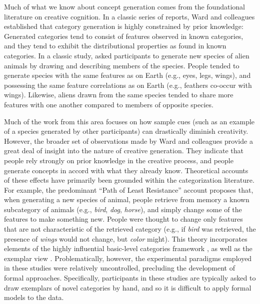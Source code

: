 \documentclass[12pt]{article}
\begin{document}
\begin{flushleft}
Much of what we know about concept generation comes from the foundational literature on creative cognition. In a classic series of reports, Ward and colleagues \citep{ward1995s,ward1994structured,marsh1999inadvertent,ward2002role,smith1993constraining} established that category generation is highly constrained by prior knowledge: Generated categories tend to consist of features observed in known categories, and they tend to exhibit the distributional properties as found in known categories. In a classic study, \cite{ward1994structured} asked participants to generate new species of alien animals by drawing and describing members of the species. People tended to generate species with the same features as on Earth (e.g., eyes, legs, wings), and possessing the same feature correlations as on Earth (e.g., feathers co-occur with wings). Likewise, aliens drawn from the same species tended to share more features with one another compared to members of opposite species. 

Much of the work from this area \citep[e.g.,][]{smith1993constraining,marsh1999inadvertent} focuses on how sample cues (such as an example of a species generated by other participants) can drastically diminish creativity. However, the broader set of observations made by Ward and colleagues provide a great deal of insight into the nature of creative generation. They indicate that people rely strongly on prior knowledge in the creative process, and people generate concepts in accord with what they already know. Theoretical accounts of these effects have primarily been grounded within the categorization literature. For example, the predominant ``Path of Least Resistance'' account \citep[see][]{ward1994structured,ward1995s,ward2002role} proposes that, when generating a new species of animal, people retrieve from memory a known subcategory of animals (e.g., \textit{bird}, \textit{dog}, \textit{horse}), and simply change some of the features to make something new. People were thought to change only features that are not characteristic of the retrieved category (e.g., if \textit{bird} was retrieved, the presence of \textit{wings} would not change, but \textit{color} might). This theory incorporates elements of the highly influential basic-level categories framework \citep{rosch1975cognitive,rosch1976basic}, as well as the exemplar view \citep{medin1978context,brooks1978nonanalytic}. Problematically, however, the experimental paradigms employed in these studies were relatively uncontrolled, precluding the development of formal approaches. Specifically, participants in these studies are typically asked to draw exemplars of novel categories by hand, and so it is difficult to apply formal models to the data.


\end{flushleft}
\end{document}
